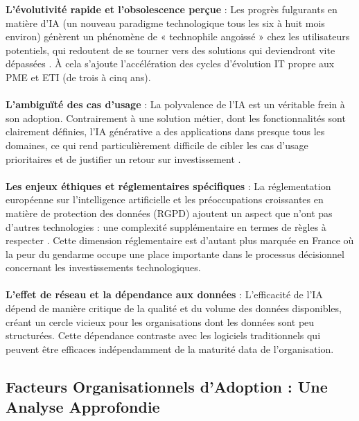 \textbf{L'évolutivité rapide et l'obsolescence perçue} : Les progrès fulgurants en matière d'IA (un nouveau paradigme technologique tous les six à huit mois environ) génèrent un phénomène de « technophile angoissé » chez les utilisateurs potentiels, qui redoutent de se tourner vers des solutions qui deviendront vite dépassées \cite{ransbotham2023expanding}. À cela s'ajoute l'accélération des cycles d'évolution IT propre aux PME et ETI (de trois à cinq ans).
\\\\
\textbf{L'ambiguïté des cas d'usage} : La polyvalence de l'IA est un véritable frein à son adoption. Contrairement à une solution métier, dont les fonctionnalités sont clairement définies, l'IA générative a des applications dans presque tous les domaines, ce qui rend particulièrement difficile de cibler les cas d'usage prioritaires et de justifier un retour sur investissement \cite{dwivedi2021artificial}.
\\\\
\textbf{Les enjeux éthiques et réglementaires spécifiques} : La réglementation européenne sur l'intelligence artificielle et les préoccupations croissantes en matière de protection des données (RGPD) ajoutent un aspect que n'ont pas d'autres technologies : une complexité supplémentaire en termes de règles à respecter \cite{bertolucci2024artificial}. Cette dimension réglementaire est d'autant plus marquée en France où la peur du gendarme occupe une place importante dans le processus décisionnel concernant les investissements technologiques.
\\\\
\textbf{L'effet de réseau et la dépendance aux données} : L'efficacité de l'IA dépend de manière critique de la qualité et du volume des données disponibles, créant un cercle vicieux pour les organisations dont les données sont peu structurées. Cette dépendance contraste avec les logiciels traditionnels qui peuvent être efficaces indépendamment de la maturité data de l'organisation.

\subsection{Facteurs Organisationnels d'Adoption : Une Analyse Approfondie}

